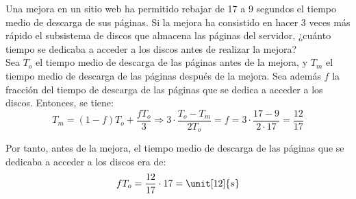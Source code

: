 \begin{ejercicio}
Una mejora en un sitio web ha permitido rebajar de 17 a 9 segundos el tiempo medio de descarga de sus páginas. Si la mejora ha consistido en hacer 3 veces más rápido el subsistema de discos que almacena las páginas del servidor, ¿cuánto tiempo se dedicaba a acceder a los discos antes de realizar la mejora?\\

Sea $T_o$ el tiempo medio de descarga de las páginas antes de la mejora, y $T_m$ el tiempo medio de descarga de las páginas después de la mejora. Sea además $f$ la fracción del tiempo de descarga de las páginas que se dedica a acceder a los discos. Entonces, se tiene:
\begin{equation*}
    T_m = (1-f)T_o + \dfrac{fT_o}{3}\Longrightarrow
    3\cdot \dfrac{T_o-T_m}{2T_o} = f = 3\cdot \dfrac{17-9}{2\cdot 17} = \dfrac{12}{17}
\end{equation*}

Por tanto, antes de la mejora, el tiempo medio de descarga de las páginas que se dedicaba a acceder a los discos era de:
\begin{equation*}
    fT_o = \dfrac{12}{17}\cdot 17 = \unit[12]{s}
\end{equation*}
\end{ejercicio}

